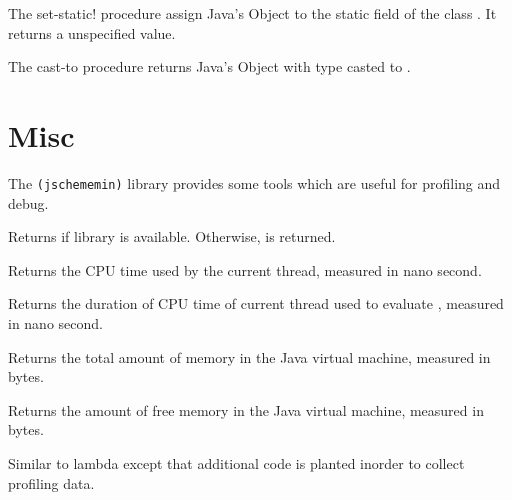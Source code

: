 \begin{entry}{%
}

The {\cf set-static!} procedure assign Java's Object  to the static field  of the class . It returns a unspecified value.

\end{entry}



\begin{entry}{%
}

The {\cf cast-to} procedure returns Java's Object  with type casted to .

\end{entry}

\section{Misc}
\label{miscsection}

The {\tt (jschememin)} library provides some tools which are useful for profiling and debug.

\begin{entry}{%
}
Returns \schtrue{} if library  is available.
Otherwise, \schfalse{} is returned.
\end{entry}

\begin{entry}{%
}
Returns the CPU time used by the current thread, measured in nano second.
\end{entry}

\begin{entry}{%
}
Returns the duration of CPU time of current thread used to evaluate , measured in nano second. 
\end{entry}

\begin{entry}{%
}
Returns the total amount of memory in the Java virtual machine, measured in bytes. 
\end{entry}

\begin{entry}{%
}
Returns the amount of free memory in the Java virtual machine, measured in bytes. 
\end{entry}

\begin{entry}{%
}
Similar to lambda except that additional code is planted inorder to collect profiling data. 
\end{entry}

